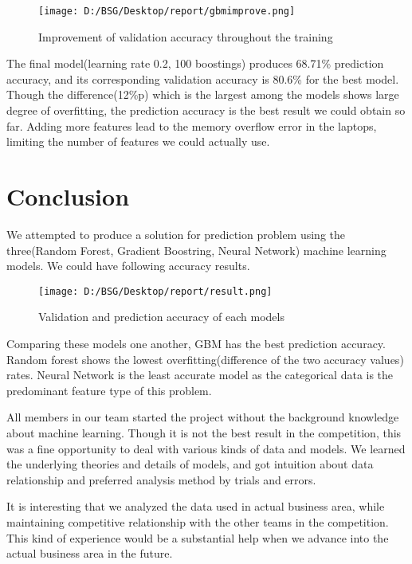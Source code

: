 \documentclass{article}
\begin{document}
\begin{figure}[!h]
  \centering
  \texttt{[image: D:/BSG/Desktop/report/gbmimprove.png]}
  \caption{Improvement of validation accuracy throughout the training}
  \label{fig:gbmimprove}
\end{figure}

The final model(learning rate 0.2, 100 boostings) produces 68.71\% prediction
accuracy, and its corresponding validation accuracy is 80.6\% for the best model. Though the difference(12\%p)
which is the largest among the models shows large degree of overfitting, the
prediction accuracy is the best result we could obtain so far.
Adding more features lead to the memory overflow error in the laptops, limiting
the number of features we could actually use.

\section{Conclusion}
We attempted to produce a solution for prediction problem using the three(Random
Forest, Gradient Boostring, Neural Network) machine learning models. We could
have following accuracy results.
\begin{figure}[!h]
  \centering
  \texttt{[image: D:/BSG/Desktop/report/result.png]}
  \caption{Validation and prediction accuracy of each models}
  \label{fig:result}
\end{figure}

Comparing these models one another, GBM has the best prediction accuracy. Random
forest shows the lowest overfitting(difference of the two accuracy values)
rates. Neural Network is the least accurate model as the categorical data is the predominant
feature type of this problem.

All members in our team started the project without the background knowledge
about machine learning. Though it is not the best result in the competition,
this was a fine opportunity to deal with various kinds of data and models. We
learned the underlying theories and details of models, and got intuition about
data relationship and preferred analysis method by trials and errors.

It is interesting that we analyzed the data used in actual business area, while
maintaining competitive relationship with the other teams in the competition.
This kind of experience would be a substantial help when we advance into
the actual business area in the future.
\end{document}

